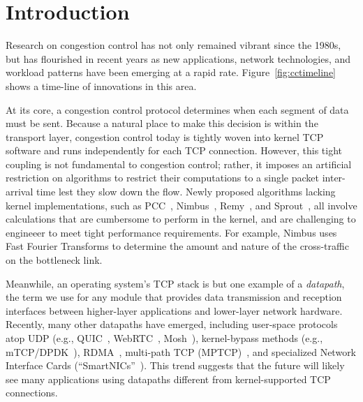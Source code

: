 \section{Introduction}
Research on congestion control has not only remained vibrant since the 1980s, but has flourished in recent years as new applications, network technologies, and workload patterns have been emerging at a rapid rate. Figure~\ref{fig:cctimeline} shows a time-line of innovations in this area.

At its core, a congestion control protocol determines when each segment of data must be sent. Because a natural place to make this decision is within the transport layer, congestion control today is tightly woven into kernel TCP software and runs independently for each TCP connection.
However, this tight coupling is not fundamental to congestion control; rather,
it imposes an artificial restriction on algorithms to restrict their
computations to a single packet inter-arrival time lest they slow down the
flow.
Newly proposed algorithms lacking kernel implementations, such as
PCC~\cite{pcc}, Nimbus~\cite{nimbus}, Remy~\cite{remy}, and
Sprout~\cite{sprout}, all involve calculations that are cumbersome to perform in
the kernel, and are challenging to engineeer to meet tight performance
requirements.
For example, Nimbus uses Fast Fourier Transforms to determine the amount and
nature of the cross-traffic on the bottleneck link.

Meanwhile, an operating system's TCP stack is but one example of a {\em datapath}, the term we use for any module that provides data transmission and reception interfaces between higher-layer applications and lower-layer network hardware. Recently, many other datapaths have emerged, including user-space protocols atop UDP (e.g., QUIC~\cite{quic}, WebRTC~\cite{webrtc}, Mosh~\cite{mosh}), kernel-bypass methods (e.g., mTCP/DPDK~\cite{dpdk,mtcp,netmap}), RDMA~\cite{dcqcn}, multi-path TCP (MPTCP)~\cite{mptcp}, and specialized Network Interface Cards (``SmartNICs''~\cite{smartnic}). This trend suggests that the future will likely see many applications using datapaths different from kernel-supported TCP connections.


